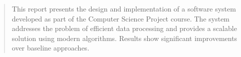 \vspace{2in}
\begin{abstract}
This report presents the design and implementation of a software system developed as part of
the Computer Science Project course. The system addresses the problem of efficient data
processing and provides a scalable solution using modern algorithms. Results show significant
improvements over baseline approaches.
\end{abstract}
